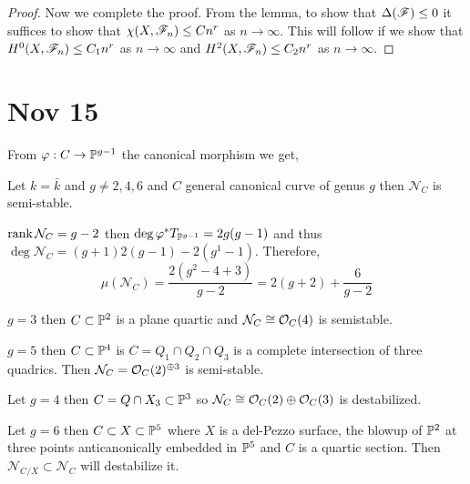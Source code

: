 \documentclass[12pt]{article}
\begin{document}
\begin{proof}
Now we complete the proof. From the lemma, to show that $\Delta(\F) \le 0$ it suffices to show that $\chi(X, \F_n) \le C n^r$ as $n \to \infty$. This will follow if we show that $H^0(X, \F_n) \le C_1 n^r$ as $n \to \infty$ and $H^2(X, \F_n) \le C_2 n^r$ as $n \to \infty$. 
\end{proof}

\section{Nov 15}

\newcommand{\cN}{\mathcal{N}}

From $\varphi : C \to \P^{g-1}$ the canonical morphism we get,
\begin{center}
\end{center}

\begin{theorem}
Let $k = \bar{k}$ and $g \neq 2,4,6$ and $C$ general canonical curve of genus $g$ then $\cN_C$ is semi-stable.
\end{theorem}

\begin{rmk}
$\rank{\cN_C} = g - 2$ then $\deg{\varphi^* T_{\P^{g-1}}} = 2 g (g - 1)$ and thus $\deg{\cN_C} = (g+1) 2(g-1) - 2 (g^1 - 1)$. Therefore,
\[ \mu(\cN_C) = \frac{2 (g^2 - 4 + 3)}{g-2} = 2 (g+2) + \frac{6}{g-2} \]
\end{rmk}

\begin{example}
$g = 3$ then $C \subset \P^2$ is a plane quartic and $\cN_C \cong \struct{C}(4)$ is semistable.
\end{example}

\begin{example}
$g = 5$ then $C \subset \P^4$ is $C = Q_1 \cap Q_2 \cap Q_3$ is a complete intersection of three quadrics. Then $\cN_C = \struct{C}(2)^{\oplus 3}$ is semi-stable. 
\end{example}

\begin{example}
Let $g = 4$ then $C = Q \cap X_3 \subset \P^3$ so $\cN_C \cong \struct{C}(2) \oplus \struct{C}(3)$ is destabilized. 
\end{example}

\begin{example}
Let $g = 6$ then $C \subset X \subset \P^5$ where $X$ is a del-Pezzo surface, the blowup of $\P^2$ at three points anticanonically embedded in $\P^5$ and $C$ is a quartic section. Then $\cN_{C/X} \subset \cN_{C}$ will destabilize it. 
\end{example}
\end{document}
